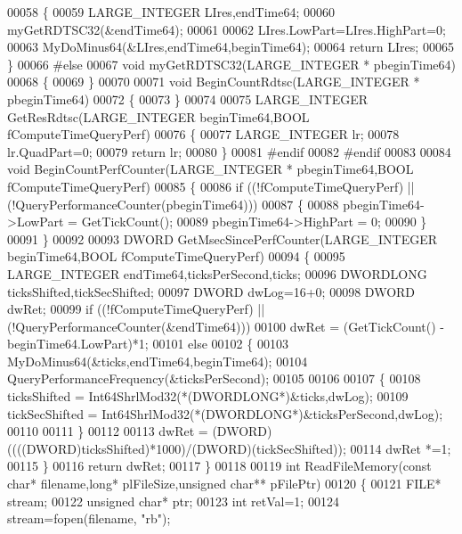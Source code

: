 \begin{DoxyCode}
{{00058 \{
00059     LARGE\_INTEGER LIres,endTime64;
00060     myGetRDTSC32(&endTime64);
00061 
00062     LIres.LowPart=LIres.HighPart=0;
00063     MyDoMinus64(&LIres,endTime64,beginTime64);
00064     \textcolor{keywordflow}{return} LIres;
00065 \}
00066 \textcolor{preprocessor}{#else}
00067 \textcolor{keywordtype}{void} myGetRDTSC32(LARGE\_INTEGER * pbeginTime64)
00068 \{
00069 \}
00070 
00071 \textcolor{keywordtype}{void} BeginCountRdtsc(LARGE\_INTEGER * pbeginTime64)
00072 \{
00073 \}
00074 
00075 LARGE\_INTEGER GetResRdtsc(LARGE\_INTEGER beginTime64,BOOL fComputeTimeQueryPerf)
00076 \{
00077     LARGE\_INTEGER lr;
00078     lr.QuadPart=0;
00079     \textcolor{keywordflow}{return} lr;
00080 \}
00081 \textcolor{preprocessor}{#endif}
00082 \textcolor{preprocessor}{#endif}
00083 
00084 \textcolor{keywordtype}{void} BeginCountPerfCounter(LARGE\_INTEGER * pbeginTime64,BOOL fComputeTimeQueryPerf)
00085 \{
00086     \textcolor{keywordflow}{if} ((!fComputeTimeQueryPerf) || (!QueryPerformanceCounter(pbeginTime64)))
00087     \{
00088         pbeginTime64->LowPart = GetTickCount();
00089         pbeginTime64->HighPart = 0;
00090     \}
00091 \}
00092 
00093 DWORD GetMsecSincePerfCounter(LARGE\_INTEGER beginTime64,BOOL fComputeTimeQueryPerf)
00094 \{
00095     LARGE\_INTEGER endTime64,ticksPerSecond,ticks;
00096     DWORDLONG ticksShifted,tickSecShifted;
00097     DWORD dwLog=16+0;
00098     DWORD dwRet;
00099     \textcolor{keywordflow}{if} ((!fComputeTimeQueryPerf) || (!QueryPerformanceCounter(&endTime64)))
00100         dwRet = (GetTickCount() - beginTime64.LowPart)*1;
00101     \textcolor{keywordflow}{else}
00102     \{
00103         MyDoMinus64(&ticks,endTime64,beginTime64);
00104         QueryPerformanceFrequency(&ticksPerSecond);
00105 
00106 
00107         \{
00108             ticksShifted = Int64ShrlMod32(*(DWORDLONG*)&ticks,dwLog);
00109             tickSecShifted = Int64ShrlMod32(*(DWORDLONG*)&ticksPerSecond,dwLog);
00110 
00111         \}
00112 
00113         dwRet = (DWORD)((((DWORD)ticksShifted)*1000)/(DWORD)(tickSecShifted));
00114         dwRet *=1;
00115     \}
00116     \textcolor{keywordflow}{return} dwRet;
00117 \}
00118 
00119 \textcolor{keywordtype}{int} ReadFileMemory(\textcolor{keyword}{const} \textcolor{keywordtype}{char}* filename,\textcolor{keywordtype}{long}* plFileSize,\textcolor{keywordtype}{unsigned} \textcolor{keywordtype}{char}** pFilePtr)
00120 \{
00121     FILE* stream;
00122     \textcolor{keywordtype}{unsigned} \textcolor{keywordtype}{char}* ptr;
00123     \textcolor{keywordtype}{int} retVal=1;
00124     stream=fopen(filename, \textcolor{stringliteral}{"rb"});
}}
\end{DoxyCode}
